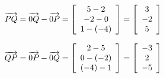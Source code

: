 \begin{enumialphparenastyle}
\begin{ex}
\begin{sol}
\begin{equation*}
\overrightarrow{PQ}  = \overrightarrow{0Q} - \overrightarrow{0P}= \left[ \begin{array}{c}
5-2\\
 -2-0 \\
1-(-4)
\end{array}
\right] = \left[ \begin{array}{c}
3\\
 -2 \\
5
\end{array}
\right]
\end{equation*}

\begin{equation*}
\overrightarrow{QP}  = \overrightarrow{0P} - \overrightarrow{0Q}= \left[ \begin{array}{c}
2-5\\
 0-(-2) \\
(-4)-1
\end{array}
\right] = \left[ \begin{array}{c}
-3\\
 2 \\
-5
\end{array}
\right]
\end{equation*}

\end{sol}
\end{ex}


\end{enumialphparenastyle}